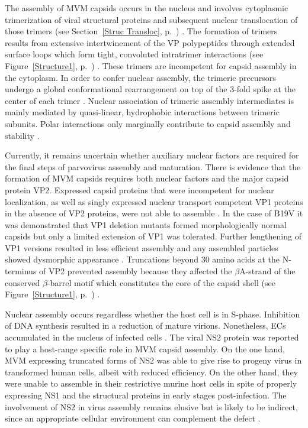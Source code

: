 The assembly of MVM capsids occurs in the nucleus and involves cytoplasmic trimerization of viral structural proteins and subsequent nuclear translocation of those trimers (see Section~\ref{Struc Transloc}, p.~\pageref{Struc Transloc}) \cite{pmid16469332}. The formation of trimers results from extensive intertwinement of the VP polypeptides through extended surface loops which form tight, convoluted intratrimer interactions (see Figure~\ref{Structure1}, p.~\pageref{Structure1}) \cite{pmid15299974, pmid21867712}. These trimers are incompetent for capsid assembly in the cytoplasm. In order to confer nuclear assembly, the trimeric precursors undergo a global conformational rearrangement on top of the 3-fold spike at the center of each trimer \cite{pmid16469332, pmid12552010, pmid17626084}. Nuclear association of trimeric assembly intermediates is mainly mediated by quasi-linear, hydrophobic interactions between trimeric subunits. Polar interactions only marginally contribute to capsid assembly and stability \cite{pmid14981262}.     

Currently, it remains uncertain whether auxiliary nuclear factors are required for the final steps of parvovirus assembly and maturation. There is evidence that the formation of MVM capsids requires both nuclear factors and the major capsid protein VP2. Expressed capsid proteins that were incompetent for nuclear localization, as well as singly expressed nuclear transport competent VP1 proteins in the absence of VP2 proteins, were not able to assemble \cite{pmid12072505, pmid10438891, pmid10729155}. In the case of B19V it was demonstrated that VP1 deletion mutants formed morphologically normal capsids but only a limited extension of VP1 was tolerated. Further lengthening of VP1 versions resulted in less efficient assembly and any assembled particles showed dysmorphic appearance \cite{pmid8207846}. Truncations beyond 30 amino acids at the N-terminus of VP2 prevented assembly because they affected the $\beta$A-strand of the conserved $\beta$-barrel motif which constitutes the core of the capsid shell (see Figure~\ref{Structure1}, p.~\pageref{Structure1}) \cite{pmid7666560}.     


Nuclear assembly occurs regardless whether the host cell is in S-phase. Inhibition of DNA synthesis resulted in a reduction of mature virions. Nonetheless, ECs accumulated in the nucleus of infected cells \cite{pmid559779, assembly}. The viral NS2 protein was reported to play a host-range specific role in MVM capsid assembly. On the one hand, MVM expressing truncated forms of NS2 was able to give rise to progeny virus in transformed human cells, albeit with reduced efficiency. On the other hand, they were unable to assemble in their restrictive murine host cells in spite of properly expressing NS1 and the structural proteins in early stages post-infection. The involvement of NS2 in virus assembly remains elusive but is likely to be indirect, since an appropriate cellular environment can complement the defect \cite{pmid9168889}.        


